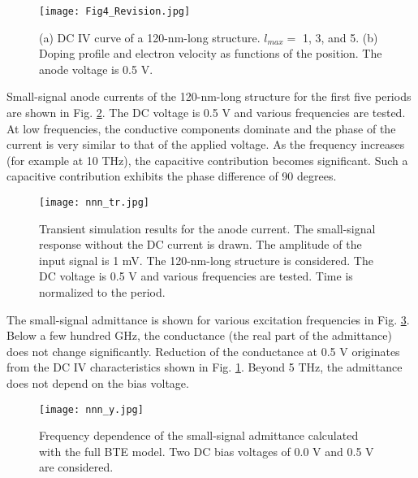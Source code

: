 \documentclass[journal]{IEEEtran}
\newcommand{\revision}[1]{{#1}}
\begin{document}
\begin{figure}[!t]
\centering
\texttt{[image: Fig4\_Revision.jpg]}
\caption{\revision{(a) DC IV curve of a 120-nm-long structure.
$l_{max} =$ 1, 3, and 5. 
(b) Doping profile and electron velocity as functions of the position. The anode voltage is 0.5 V.}}
\label{fig_nnn_dc}
\end{figure}     
   
   Small-signal anode currents of the 120-nm-long structure for the first five periods are shown in Fig. \ref{fig_nnn_tr}. 
   The DC voltage is 0.5 V and various frequencies are tested. 
\revision{At low frequencies, the conductive components dominate and the phase of the current is very similar to that of the applied voltage.}
   As the frequency increases (for example at 10 THz), the capacitive contribution becomes significant.
\revision{Such a capacitive contribution exhibits the phase difference of 90 degrees.}
      
\begin{figure}[!t]
\centering
\texttt{[image: nnn\_tr.jpg]}
\caption{Transient simulation results for the anode current. 
The small-signal response without the DC current is drawn. 
The amplitude of the input signal is 1 mV.
The 120-nm-long structure is considered. 
The DC voltage is 0.5 V and various frequencies are tested. 
Time is normalized to the period.}
\label{fig_nnn_tr}
\end{figure}   

   The small-signal admittance 
is shown for various excitation frequencies in Fig. \ref{fig_nnn_y}.
   Below a few hundred GHz, the conductance (the real part of the admittance) does not change significantly. 
   Reduction of the conductance at 0.5 V originates from the DC IV characteristics shown in Fig. \ref{fig_nnn_dc}.  
   Beyond 5 THz, the admittance does not depend on the bias voltage.

\begin{figure}[!t]
\centering
\texttt{[image: nnn\_y.jpg]}
\caption{Frequency dependence of the small-signal admittance calculated with the full BTE model.  
Two DC bias voltages of 0.0 V and 0.5 V are considered.}
\label{fig_nnn_y}
\end{figure}  
    
\end{document}
